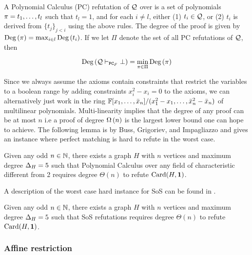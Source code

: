 \documentclass[11pt]{article}
\begin{document}
\begin{definition}\label{def:poly-calc-refutations}
A Polynomial Calculus (PC) refutation of $\mathcal{Q}$ over is a set of polynomials $\pi = t_1, \dots, t_l$	such that $t_l = 1$, and for each $i \neq l$, either (1) $t_i \in \mathcal{Q}$, or (2) $t_i$ is derived from $\{t_j\}_{j < i}$ using the above rules.
The degree of the proof is given by $\text{Deg}\left(\pi\right) = \max_{i \in l}\text{Deg}\left(t_i\right)$. If we let $\Pi$ denote the set of all PC refutations of $\mathcal{Q}$, then

\[ \text{Deg}\left(\mathcal{Q} \vdash_{\texttt{PC}_F} \bot\right) = \min_{\pi \in \Pi}\text{Deg}\left(\pi\right)\]
\end{definition}
Since we always assume the axioms contain constraints that restrict the variables to a boolean range by adding constraints $x_i^2 - x_i=0$ to the axioms, we can alternatively just work in the ring $\mathbb{F}[x_1, \dots, \bar{x}_n]/(x_1^2 - x_1, \dots, \bar{x}_n^2 - \bar{x}_n)$ of multilinear polynomials.
Multi-linearity implies that the degree of any proof can be at most $n$ i.e a proof of degree $\Omega\left(n\right)$ is the largest lower bound one can hope to achieve.
The following lemma is by Buss, Grigoriev, and Impagliazzo \cite{buss1999linear} and gives an instance where perfect matching is hard to refute in the worst case. 

\begin{lemma}\label{lemma:worst-case-instance-PC}Given any odd $n \in \mathbb{N}$, there exists a graph $H$ with $n$ vertices and maximum degree $\Delta_{H}= 5$ such that Polynomial Calculus over any field of characteristic different from 2 requires degree $\Theta(n)$ to refute $\text{Card}(H, \mathbf{1})$.
\end{lemma}
A description of the  worst case hard instance for SoS can be found in \citep[Theorem A.3]{Austrin_2022}.

\begin{lemma}\label{lemma:worst-case-instance-sos}
Given any odd $n \in \mathbb{N}$, there exists a graph $H$ with $n$ vertices and maximum degree $\Delta_{H}= 5$ such that SoS refutations requires degree $\Theta(n)$ to refute $\text{Card}(H, \mathbf{1})$.
\end{lemma}

\subsubsection{Affine restriction} 
\end{document}
